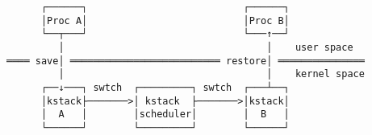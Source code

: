 \documentclass[varwidth=40em,crop]{standalone}
\begin{document}
\begin{verbatim}
      ┌──────┐                           ┌──────┐
      │Proc A│                           │Proc B│
      └──┬───┘                           └───↑──┘
         │                                   │    user space
════ save│ ══════════════════════════ restore│ ═══════════════
         │                                   │    kernel space
      ┌──↓───┐ swtch  ┌─────────┐ swtch  ┌───┴──┐
      │kstack├───────>│ kstack  ├───────>│kstack│
      │  A   │        │scheduler│        │  B   │
      └──────┘        └─────────┘        └──────┘
\end{verbatim}
\end{document}

